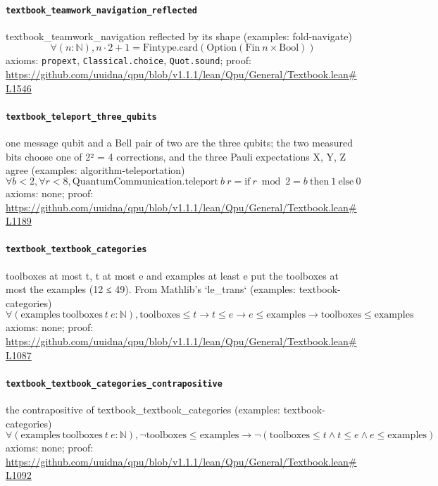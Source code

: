 \documentclass[11pt]{article}
\begin{document}
\paragraph{\texttt{textbook\_teamwork\_navigation\_reflected}}
textbook\_teamwork\_navigation reflected by its shape (examples: fold-navigate)
\[ \forall (n : \mathbb{N}), n \cdot 2 + 1 = \mathrm{Fintype.card} (\mathrm{Option} (\mathrm{Fin}\ n \times \mathrm{Bool})) \]
\noindent axioms: \texttt{propext}, \texttt{Classical.choice}, \texttt{Quot.sound}; proof: \url{https://github.com/uuidna/qpu/blob/v1.1.1/lean/Qpu/General/Textbook.lean\#L1546}

\paragraph{\texttt{textbook\_teleport\_three\_qubits}}
one message qubit and a Bell pair of two are the three qubits; the two measured bits choose one of 2² = 4 corrections, and the three Pauli expectations X, Y, Z agree (examples: algorithm-teleportation)
\[ \forall b < 2, \forall r < 8, \mathrm{QuantumCommunication.teleport}\ b\ r = \mathrm{if}\ r \bmod 2 = b\ \mathrm{then}\ 1\ \mathrm{else}\ 0 \]
\noindent axioms: none; proof: \url{https://github.com/uuidna/qpu/blob/v1.1.1/lean/Qpu/General/Textbook.lean\#L1189}

\paragraph{\texttt{textbook\_textbook\_categories}}
toolboxes at most t, t at most e and examples at least e put the toolboxes at most the examples (12 ≤ 49). From Mathlib's `le\_trans` (examples: textbook-categories)
\[ \forall (\mathrm{examples}\ \mathrm{toolboxes}\ t\ e : \mathbb{N}), \mathrm{toolboxes} \le t \to t \le e \to e \le \mathrm{examples} \to \mathrm{toolboxes} \le \mathrm{examples} \]
\noindent axioms: none; proof: \url{https://github.com/uuidna/qpu/blob/v1.1.1/lean/Qpu/General/Textbook.lean\#L1087}

\paragraph{\texttt{textbook\_textbook\_categories\_contrapositive}}
the contrapositive of textbook\_textbook\_categories (examples: textbook-categories)
\[ \forall (\mathrm{examples}\ \mathrm{toolboxes}\ t\ e : \mathbb{N}), \neg \mathrm{toolboxes} \le \mathrm{examples} \to \neg (\mathrm{toolboxes} \le t \land t \le e \land e \le \mathrm{examples}) \]
\noindent axioms: none; proof: \url{https://github.com/uuidna/qpu/blob/v1.1.1/lean/Qpu/General/Textbook.lean\#L1092}
\end{document}
